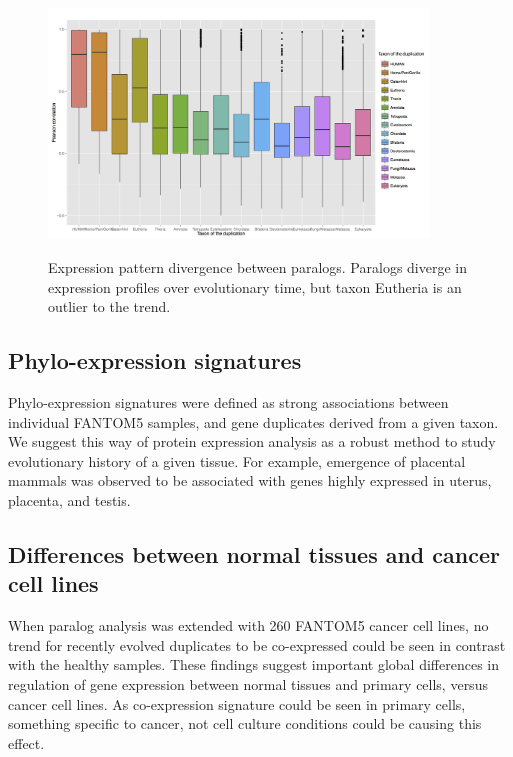 \documentclass[11pt, a4paper,oneside]{report}
\begin{document}
\begin{figure}[ht]
\begin{center}
\label{img:populations}
\includegraphics[width=0.9\textwidth]{figures/fantom_eutheria.png}
\end{center}
\caption{Expression pattern divergence between paralogs.
Paralogs diverge in expression profiles over evolutionary time, but taxon Eutheria is an outlier to the trend.} 
\end{figure}

\subsection{Phylo-expression signatures}
Phylo-expression signatures were defined as strong associations between individual FANTOM5 samples, and gene duplicates derived from a given taxon. We suggest this way of protein expression analysis as a robust method to study evolutionary history of a given tissue. For example, emergence of placental mammals was observed to be associated with genes highly expressed in uterus, placenta, and testis.

\subsection{Differences between normal tissues and cancer cell lines}
When paralog analysis was extended with 260 FANTOM5 cancer cell lines, no trend for recently evolved duplicates to be co-expressed could be seen in contrast with the healthy samples. These findings suggest important global differences in regulation of gene expression between normal tissues and primary cells, versus cancer cell lines. As co-expression signature could be seen in primary cells, something specific to cancer, not cell culture conditions could be causing this effect.
\end{document}
